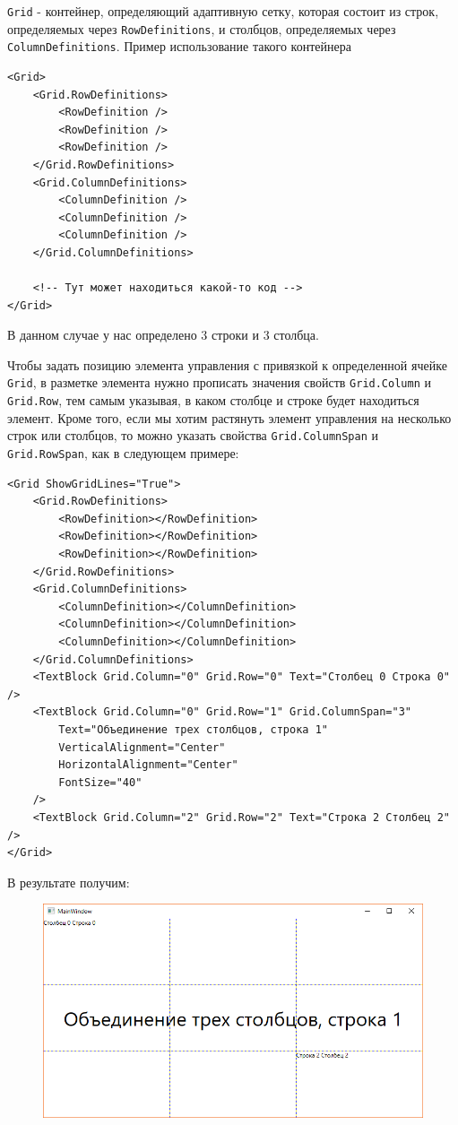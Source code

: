 \texttt{Grid} - контейнер, определяющий адаптивную сетку, которая состоит из строк, определяемых через \texttt{RowDefinitions}, и столбцов, определяемых через \texttt{ColumnDefinitions}. Пример использование такого контейнера

\begin{verbatim}
<Grid>
    <Grid.RowDefinitions>
        <RowDefinition />
        <RowDefinition />
        <RowDefinition />
    </Grid.RowDefinitions>
    <Grid.ColumnDefinitions>
        <ColumnDefinition />
        <ColumnDefinition />
        <ColumnDefinition />
    </Grid.ColumnDefinitions>
    
    <!-- Тут может находиться какой-то код -->
</Grid>
\end{verbatim}

В данном случае у нас определено 3 строки и 3 столбца.

Чтобы задать позицию элемента управления с привязкой к определенной ячейке \texttt{Grid}, в разметке элемента нужно прописать значения свойств \texttt{Grid.Column} и \texttt{Grid.Row}, тем самым указывая, в каком столбце и строке будет находиться элемент. Кроме того, если мы хотим растянуть элемент управления на несколько строк или столбцов, то можно указать свойства \texttt{Grid.ColumnSpan} и \texttt{Grid.RowSpan}, как в следующем примере:

\begin{verbatim}
<Grid ShowGridLines="True">
    <Grid.RowDefinitions>
        <RowDefinition></RowDefinition>
        <RowDefinition></RowDefinition>
        <RowDefinition></RowDefinition>
    </Grid.RowDefinitions>
    <Grid.ColumnDefinitions>
        <ColumnDefinition></ColumnDefinition>
        <ColumnDefinition></ColumnDefinition>
        <ColumnDefinition></ColumnDefinition>
    </Grid.ColumnDefinitions>
    <TextBlock Grid.Column="0" Grid.Row="0" Text="Столбец 0 Строка 0" />
    <TextBlock Grid.Column="0" Grid.Row="1" Grid.ColumnSpan="3" 
        Text="Объединение трех столбцов, строка 1" 
        VerticalAlignment="Center" 
        HorizontalAlignment="Center" 
        FontSize="40" 
    />
    <TextBlock Grid.Column="2" Grid.Row="2" Text="Строка 2 Столбец 2" />
</Grid>
\end{verbatim}

В результате получим:

\begin{figure}[H]
\centering
\includegraphics[width=1\textwidth]{manager_grid.png}
\end{figure}


